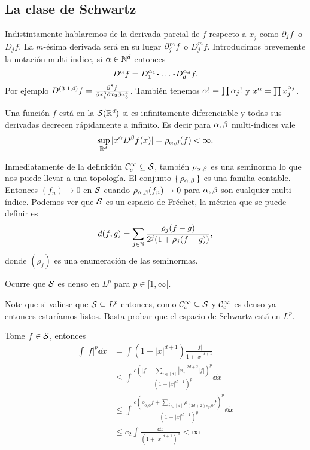 \documentclass[12pt]{memoir}
\begin{document}
\subsection{La clase de Schwartz}

Indistintamente hablaremos de la derivada parcial de $f$ respecto a $x_j$ como $\partial_j f$ o $D_j f$. La $m$-ésima derivada será en su lugar $\partial_j^m f$ o $D_j^m f$. Introducimos brevemente la notación multi-índice, si $\alpha\in\mathbb{N}^d$ entonces
$$D^\al f=D_1^{\al_1}\.\dots\.D_d^{\al_d}f.$$
Por ejemplo $D^{(3,1,4)}f=\frac{\partial^8f}{\partial x_1^3\partial x_2\partial x_3^4}$. También tenemos $\alpha!=\prod\alpha_j!$ y $x^\alpha=\prod x_j^{\alpha_j}$.

\begin{Def}
  Una función $f$ está en la  $\mathcal{S}(\mathbb{R}^d)$ si es infinitamente diferenciable y todas sus derivadas decrecen rápidamente a infinito. Es decir para $\alpha,\beta$ multi-índices vale
  $$\sup_{\mathbb{R}^d}|x^\alpha D^\beta f(x)|=\rho_{\alpha,\beta}(f)<\infty.$$
\end{Def}

Inmediatamente de la definición $\mathcal{C}^\infty_c\subseteq\mathcal{S}$, también $\rho_{\alpha,\beta}$ es una seminorma lo que nos puede llevar a una topología. El conjunto $\{\,\rho_{\alpha,\beta}\,\}$ es una familia contable. Entonces $(f_n)\to 0$ en $\mathcal{S}$ cuando $\rho_{\alpha,\beta}(f_n)\to 0$ para $\alpha,\beta$ son cualquier multi-índice. Podemos ver que $\mathcal{S}$ es un espacio de Fréchet, la métrica que se puede definir es
$$d(f,g)=\sum_{j\in\mathbb{N}}\frac{\rho_j(f-g)}{2^j(1+\rho_j(f-g))},$$
donde $(\rho_j)$ es una enumeración de las seminormas.

\begin{Th}
  Ocurre que $\mathcal{S}$ es denso en $L^p$ para $p\in[1,\infty[$.
\end{Th}

Note que si valiese que $\mathcal{S}\subseteq L^p$ entonces, como $\mathcal{C}^\infty_c\subseteq\mathcal{S}$ y $\mathcal{C}^\infty_c$ es denso ya entonces estaríamos listos. Basta probar que el espacio de Schwartz está en $L^p$.

\begin{ptcbp}
  Tome $f\in\mathcal{S}$, entonces 
  \begin{align*}
    \int|f|^p\dd x&=\int(1+|x|^{d+1})\frac{|f|}{1+|x|^{d+1}}\\
    &\leq \int\frac{c(|f|+\sum_{j\in[d]}|x_j|^{2d+2}|f|)^p}{(1+|x|^{d+1})^p}\dd x\\
    &\leq \int\frac{c(\rho_{0,0}f+\sum_{j\in[d]}\rho_{(2d+2)e_j,0}f)^p}{(1+|x|^{d+1})^p}\dd x\\
    &\leq c_2\int\frac{\dd x}{(1+|x|^{d+1})^p}<\infty
  \end{align*} 
\end{ptcbp}
\end{document}
